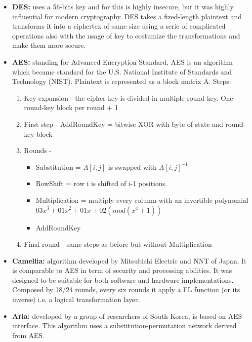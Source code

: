 \documentclass[11pt,a4paper]{article}
\begin{document}
\begin{itemize}
    \item \textbf{DES:} uses a 56-bits key and for this is highly insecure, but it was highly influential for modern cryptography. DES takes a fized-length plaintext and transforms it into a ciphertex of same size using a serie of complicated operations also with the usage of key to costumize the transformations and make them more secure.
  \item \textbf{AES:} standing for Advanced Encryption Standard, AES is an algorithm which became standard for the U.S. National Institute of Standards and Technology (NIST).
  Plaintext is represented as a block matrix A.
  Steps: 
  \begin{enumerate}
      \item Key expansion - the cipher key is divided in multiple round key. One round-key block per round + 1
      \item First step - AddRoundKey = bitwise XOR with byte of state and round-key block
      \item Rounds - \begin{itemize}
          \item Substitution = $A[i,j]$ is swapped with $A[i,j]^{-1}$
          \item RowShift = row i is shifted of i-1 positions.
          \item Multiplication =  multiply every column with an invertible polynomial $03x^{3}+01x^{2}+01x+02(mod(x^{4}+1))$
          \item AddRoundKey
      \end{itemize}
      \item Final round - same steps as before but without Multiplication
  \end{enumerate}
  \item \textbf{Camellia:} algorithm developed by Mitsubishi Electric and NNT of Japan. It is comparable to AES in term of security and processing abilities. It was designed to be suitable for both software and hardware implementations. Composed by 18/24 rounds, every six rounds it apply a FL function (or its inverse) i.e. a logical transformation layer.
  \item \textbf{Aria:} developed by a group of researchers of South Korea, is based on AES interface. This algorithm uses a substitution-permutation network derived from AES.
  
\end{itemize}

\clearpage
\end{document}

